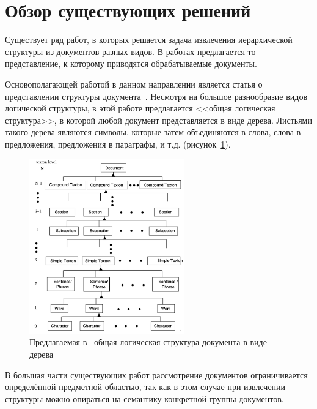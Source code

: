 \section{Обзор существующих решений}
\label{sec:Chapter2} 

Существует ряд работ, в которых решается задача извлечения иерархической структуры из документов разных видов.
В работах предлагается то представление, к которому приводятся обрабатываемые документы.

Основополагающей работой в данном направлении является статья о представлении структуры документа~\cite{dori1997representation}.
Несмотря на большое разнообразие видов логической структуры, в этой работе
предлагается <<общая логическая структура>>, в которой любой документ представляется в виде дерева.
Листьями такого дерева являются символы, которые затем объединяются в слова,
слова в предложения, предложения в параграфы, и т.д. (рисунок~\ref{fig:dori1997representation}).
\begin{figure}[h]
        \begin{center}
        \includegraphics[width=0.6\textwidth]{img/dori1997representation}
        \caption{Предлагаемая в~\cite{dori1997representation} общая логическая структура документа в виде дерева}
        \label{fig:dori1997representation}
        \end{center}
\end{figure}

В большая части существующих работ рассмотрение документов ограничивается определённой предметной областью,
так как в этом случае при извлечении структуры можно опираться на семантику конкретной группы документов.

